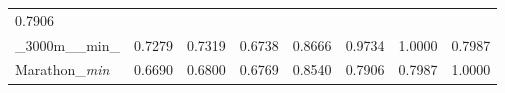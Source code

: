 \documentclass[11pt]{article}
\begin{document}
\begin{longtable}[]{@{}llllllll@{}}
\begin{minipage}[t]{0.10\columnwidth}
0.7906\strut
\end{minipage}\tabularnewline
\begin{minipage}[t]{0.10\columnwidth}\raggedright
\_3000m\_\_min\_\strut
\end{minipage} & \begin{minipage}[t]{0.10\columnwidth}\raggedright
0.7279\strut
\end{minipage} & \begin{minipage}[t]{0.10\columnwidth}\raggedright
0.7319\strut
\end{minipage} & \begin{minipage}[t]{0.10\columnwidth}\raggedright
0.6738\strut
\end{minipage} & \begin{minipage}[t]{0.10\columnwidth}\raggedright
0.8666\strut
\end{minipage} & \begin{minipage}[t]{0.10\columnwidth}\raggedright
0.9734\strut
\end{minipage} & \begin{minipage}[t]{0.10\columnwidth}\raggedright
1.0000\strut
\end{minipage} & \begin{minipage}[t]{0.10\columnwidth}\raggedright
0.7987\strut
\end{minipage}\tabularnewline
\begin{minipage}[t]{0.10\columnwidth}\raggedright
Marathon\_\emph{min}\strut
\end{minipage} & \begin{minipage}[t]{0.10\columnwidth}\raggedright
0.6690\strut
\end{minipage} & \begin{minipage}[t]{0.10\columnwidth}\raggedright
0.6800\strut
\end{minipage} & \begin{minipage}[t]{0.10\columnwidth}\raggedright
0.6769\strut
\end{minipage} & \begin{minipage}[t]{0.10\columnwidth}\raggedright
0.8540\strut
\end{minipage} & \begin{minipage}[t]{0.10\columnwidth}\raggedright
0.7906\strut
\end{minipage} & \begin{minipage}[t]{0.10\columnwidth}\raggedright
0.7987\strut
\end{minipage} & \begin{minipage}[t]{0.10\columnwidth}\raggedright
1.0000\strut
\end{minipage}\tabularnewline
\bottomrule
\end{longtable}
\end{document}
